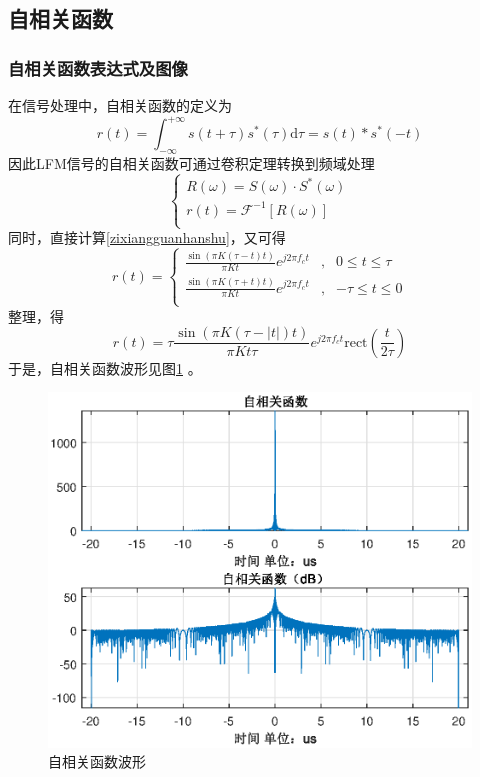 \documentclass[12pt]{article}
\begin{document}
\subsection{自相关函数}
\subsubsection{自相关函数表达式及图像}
在信号处理中，自相关函数的定义为
\begin{equation}\label{zixiangguanhanshu}
  r(t)=\int_{-\infty}^{+\infty}s(t+\tau)s^*(\tau)\mbox{d}\tau=s(t)*s^*(-t)
\end{equation}
因此LFM信号的自相关函数可通过卷积定理转换到频域处理
\begin{equation}\label{zixiangguanhanshu2}
\left\{
\begin{array}{c}
   R(\omega)=S(\omega)\cdot S^*(\omega) \\
  r(t)=\mathscr{F}^{-1}[R(\omega)]\\
\end{array}
\right.
\end{equation}
同时，直接计算\ref{zixiangguanhanshu}，又可得
\begin{equation}\label{zhijiejisuan}
r(t)=\left\{
  \begin{array}{ccc}
   \frac{\sin(\pi K (\tau-t)t)}{\pi K t}e^{j2\pi f_c t} &,& 0 \leq t\leq \tau\\
    \frac{\sin(\pi K (\tau+t)t)}{\pi K t}e^{j2\pi f_c t} &,& -\tau \leq t\leq 0 \\
  \end{array}
  \right.
\end{equation}
整理，得
\begin{equation}\label{zixiangguanhanshuyupipeilvboxiang}
r(t)=\tau\frac{\sin(\pi K (\tau-|t|)t)}{\pi K t\tau}e^{j2\pi f_c t}\mbox{rect}(\frac{t}{2\tau})
\end{equation}
于是，自相关函数波形见图\ref{zxghs}
。
\begin{figure}[htbp]
  \centering
  \includegraphics[width=\textwidth]{zxghs}
  \caption{自相关函数波形}\label{zxghs}
\end{figure}
\end{document}
